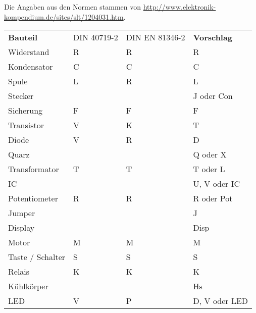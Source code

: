 Die Angaben aus den Normen stammen von 
\url{http://www.elektronik-kompendium.de/sites/slt/1204031.htm}. 
\begin{table}[h!]
  \begin{tabular}{llll}
  \rowcolor{white}  \textbf{Bauteil} 	    & DIN 40719-2   & DIN EN 81346-2    & \textbf{Vorschlag}\\
  \rowcolor{lgray}  Widerstand              & R             & R                 & R \\
  \rowcolor{white}  Kondensator             & C             & C                 & C \\
  \rowcolor{lgray}  Spule                   & L             & R                 & L \\
  \rowcolor{white}  Stecker                 &               &                   & J oder Con \\
  \rowcolor{lgray}  Sicherung               & F             & F                 & F \\
  \rowcolor{white}  Transistor              & V             & K                 & T \\
  \rowcolor{lgray}  Diode                   & V             & R                 & D \\
  \rowcolor{white}  Quarz                   &               &                   & Q oder X \\
  \rowcolor{lgray}  Transformator           & T             & T                 & T oder L \\
  \rowcolor{white}  IC                      &               &                   & U, V oder IC \\
  \rowcolor{lgray}  Potentiometer           & R             & R                 & R oder Pot \\
  \rowcolor{white}  Jumper                  &               &                   & J \\
  \rowcolor{lgray}  Display                 &               &                   & Disp \\
  \rowcolor{white}  Motor                   & M             & M                 & M \\
  \rowcolor{lgray}  Taste / Schalter        & S             & S                 & S \\
  \rowcolor{white}  Relais                  & K             & K                 & K \\
  \rowcolor{lgray}  Kühlkörper              &               &                   & Hs \\
  \rowcolor{white}  LED                     & V             & P                 & D, V oder LED \\

\end{tabular}
\end{table}
